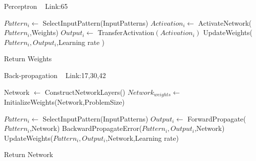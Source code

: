 \documentclass[a4paper]{article}
\begin{document}
  \begin{algorithm}
   \caption{Perceptron ~\cite{perceptron1} Link:{65}}
    \begin{algorithmic}[1]
    
            \State $Pattern_i \leftarrow$ SelectInputPattern(InputPatterns)
            \State $Activation_i \leftarrow$ ActivateNetwork($Pattern_i$,Weights)
            \State $Output_i \leftarrow$ TransferActivation$(Activation_i)$
            \State UpdateWeights($Pattern_i,Output_i$,Learning rate )
        \EndFor
        
       
       \State Return Weights



 

\end{algorithmic}
\end{algorithm}


  \begin{algorithm}
   \caption{Back-propagation  ~\cite{backpropagation12} Link:17,30,42}
    \begin{algorithmic}[1]
     \State Network $\leftarrow$ ConstructNetworkLayers()
     \State $Network_{weights} \leftarrow$ InitializeWeights(Network,ProblemSize)
    
            \State $Pattern_i \leftarrow$ SelectInputPattern(InputPatterns)
            \State $Output_i \leftarrow $ ForwardPropagate($Pattern_i$,Network)
            \State BackwardPropagateError($Pattern_i,Output_i$,Network)
            \State UpdateWeights($Pattern_i,Output_i$,Network,Learning rate)
        \EndFor
        
       
       \State Return Network



 

\end{algorithmic}
\end{algorithm}
\end{document}
